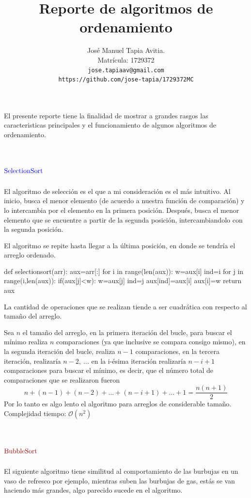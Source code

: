 \documentclass[12pt,a4paper]{article}
\author{
Jos\'e Manuel Tapia Avitia.\\
Matr\'icula: 1729372\\ 
\texttt{jose.tapiaav@gmail.com}\\
\texttt{https://github.com/jose-tapia/1729372MC}
}
\title{Reporte de algoritmos de ordenamiento}
\begin{document}
\maketitle

El presente reporte tiene la finalidad de mostrar a grandes rasgos las caracteristicas principales y el funcionamiento de algunos algoritmos de ordenamiento.

\section{$\textcolor{blue}{\mathrm{SelectionSort}}$}
El algoritmo de selecci\'on es el que a mi consideraci\'on es el m\'as intuitivo.
\newline
Al inicio, busca el menor elemento (de acuerdo a nuestra funci\'on de comparaci\'on) y lo intercambia por el elemento en la primera posici\'on. Despu\'es, busca el menor elemento que se encuentre a partir de la segunda posici\'on, intercambiandolo con la segunda posici\'on.
 
  El algoritmo se repite hasta llegar a la \'ultima posici\'on, en donde se tendr\'ia el arreglo ordenado.
 
 
\begin{python}
 def selectionsort(arr):
    aux=arr[:]
    for i in range(len(aux)):
        w=aux[i]
        ind=i
        for j in range(i,len(aux)):
            if(aux[j]<w):
                w=aux[j]
                ind=j
        aux[ind]=aux[i]
        aux[i]=w
    return aux
\end{python}

La cantidad de operaciones que se realizan tiende a ser cuadr\'atica con respecto al tama\~no del arreglo.

 Sea $n$ el tama\~no del arreglo, en la primera iteraci\'on del bucle, para buscar el m\'inimo realiza $n$ comparaciones (ya que inclusive se compara consigo mismo), en la segunda iteraci\'on del bucle, realiza $n-1$ comparaciones, en la tercera iteraci\'on, realizar\'ia $n-2,\>\dots$ en la i-\'esima iteraci\'on realizar\'ia $n-i+1$ comparaciones para buscar el m\'inimo, es decir, que el n\'umero total de comparaciones que se realizaron fueron $$n+(n-1)+(n-2)+\dots+(n-i+1)+\dots+1= \frac{n(n+1)}{2}$$
Por lo tanto es algo lento el algoritmo para arreglos de considerable tama\~no.
\newline
Complejidad tiempo: $\mathcal{O}(n^2)$


\section{$\textcolor{deepred}{\mathrm{BubbleSort}}$}
El siguiente algoritmo tiene similitud al comportamiento de las burbujas en un vaso de refresco por ejemplo, mientras suben las burbujas de gas, est\'as se van haciendo m\'as grandes, algo parecido sucede en el algoritmo.
\newline
\end{document}
